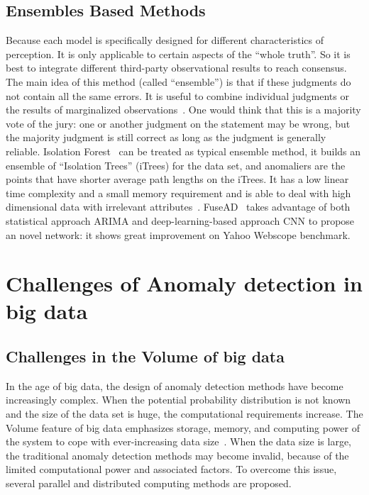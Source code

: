 \subsection{Ensembles Based Methods}

Because each model is specifically designed
for different characteristics of perception.
It is only applicable to certain aspects of
the ``whole truth''.
So it is best to integrate different
third-party observational results to reach consensus.
The main idea of this method (called ``ensemble'')
is that if these judgments do not contain
all the same errors.
It is useful to combine individual judgments or
the results of marginalized observations~\cite{zhou2012ensemble}.
One would think that this is a majority vote of
the jury:
one or another judgment on the statement may be wrong,
but the majority judgment is still correct as long as
the judgment is generally reliable.
Isolation Forest~\cite{liu2008isolation}
can be treated as typical ensemble method,
it builds an ensemble of “Isolation Trees” (iTrees) for
the data set,
and anomaliers are the points that
have shorter average path lengths on the iTrees.
It has a low linear time complexity and
a small memory requirement
and is able to deal with high dimensional data with irrelevant attributes~\cite{chandola2009anomaly}.
FuseAD~\cite{munir2019fusead}
takes advantage of both statistical approach ARIMA
and deep-learning-based approach
CNN to propose an novel network:
it shows great improvement on Yahoo Webscope benchmark.

\section{Challenges of Anomaly detection in big data}
\label{sec-challenge-big}

\subsection{Challenges in the Volume of big data}

In the age of big data,
the design of anomaly detection methods have become increasingly complex.
When the potential probability distribution is not
known and the size of the data set is huge,
the computational requirements increase.
The Volume feature of big data emphasizes storage,
memory,
and computing power of the system to
cope with ever-increasing data size~\cite{gadepally2014big}.
When the data size is large,
the traditional anomaly detection methods may become invalid,
because of the limited computational power and associated factors.
To overcome this issue,
several parallel and distributed computing methods are proposed.

